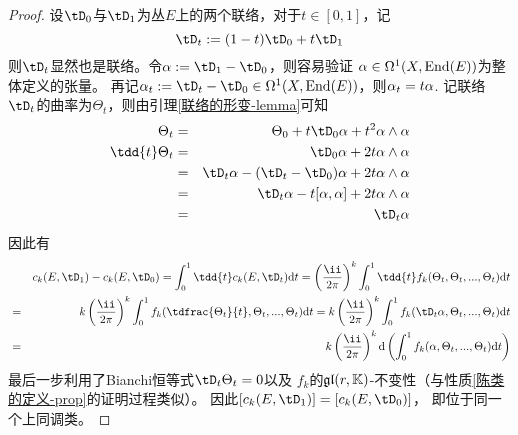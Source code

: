 \begin{proof}
设$\tD_0$与$\tD_1$为丛$E$上的两个联络，对于$t\in[0,1]$，记
$$\tD_t:=(1-t)\tD_0+t\tD_1$$
则$\tD_t$显然也是联络。令$\afa:=\tD_1-\tD_0$，则容易验证
$\alpha\in\Omega^1(X,\operatorname{End}(E))$为整体定义的张量。
再记$\afa_t:=\tD_t-\tD_0\in\Omg^1(X,\End(E))$，则$\alpha_t=t\alpha$.
记联络$\tD_t$的曲率为$\Theta_t$，则由引理\ref{联络的形变-lemma}可知
\begin{eqnarray*}
     \Theta_t
&=& 
     \Theta_0+t\tD_0\afa+t^2\afa\wedge\afa
\\
     \tdd{t}\Theta_t
&=&
     \tD_0\afa+2t\afa\wedge\afa\\
&=&
     \tD_t\afa-(\tD_t-\tD_0)\afa+2t\afa\wedge\afa\\
&=&
     \tD_t\afa-t[\afa,\afa]+2t\afa\wedge\afa\\
&=&
     \tD_t\afa
\end{eqnarray*}
因此有
\begin{eqnarray*}
& &
     c_k(E,\tD_1)-c_k(E,\tD_0)
 =
     \int_{0}^{1}
       \tdd{t}c_k(E,\tD_t)\td t
 =
     \left(
       \frac{\ii}{2\pi}
     \right)^k
     \int_{0}^{1}
       \tdd{t}f_k(\Theta_t,\Theta_t,...,\Theta_t)
       \td t\\
&=&
     k\left(
       \frac{\ii}{2\pi}
     \right)^k
     \int_{0}^{1}
       f_k(\tdfrac{\Theta_t}{t},\Theta_t,...,\Theta_t)
       \td t
 =
     k\left(
       \frac{\ii}{2\pi}
     \right)^k
     \int_{0}^{1}
       f_k(\tD_t\afa,\Theta_t,...,\Theta_t)
       \td t\\
&=&
     k\left(
       \frac{\ii}{2\pi}
     \right)^k
     \td\left(
       \int_{0}^{1}
         f_k(\afa,\Theta_t,...,\Theta_t)
         \td t
     \right)
\end{eqnarray*}
最后一步利用了Bianchi恒等式$\tD_t\Theta_t=0$以及
$f_k$的$\mathfrak{gl}(r,\mathbb{K})$-不变性（与性质\ref{陈类的定义-prop}的证明过程类似）。
因此$[c_k(E,\tD_1)]=[c_k(E,\tD_0)]$，
即位于同一个上同调类。
\end{proof}


